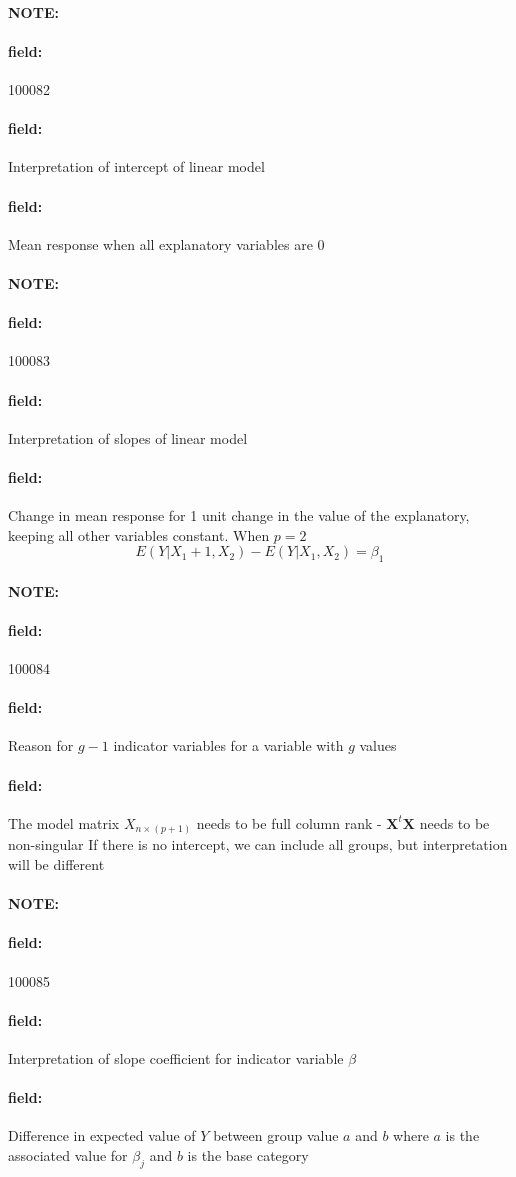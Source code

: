 \documentclass[12pt]{article}
\newenvironment{note}{\paragraph{NOTE:}}{}
\newenvironment{field}{\paragraph{field:}}{}
\begin{document}
\begin{note} \begin{field} \tiny 100082 \end{field}
 \begin{field}
  Interpretation of intercept of linear model
 \end{field}
 \begin{field}
  Mean response when all explanatory variables are 0
 \end{field}
\end{note}



\begin{note} \begin{field} \tiny 100083 \end{field}
 \begin{field}
  Interpretation of slopes of linear model
 \end{field}
 \begin{field}
  Change in mean response for 1 unit change in the value of the explanatory, keeping all other variables constant. When $p = 2$
  $$ E(Y|X_1 + 1, X_2) - E(Y|X_1,X_2) = \beta_1$$
 \end{field}
\end{note}

\begin{note} \begin{field} \tiny 100084 \end{field}
 \begin{field}
  Reason for $g-1$ indicator variables for a variable with $g$ values
 \end{field}
 \begin{field}
  The model matrix $X_{n \times(p+1)}$ needs to be full column rank - $\mathbf{X}^t \mathbf{X}$ needs to be non-singular
  If there is no intercept, we can include all groups, but interpretation will be different
 \end{field}
\end{note}

\begin{note} \begin{field} \tiny 100085 \end{field}
 \begin{field}
  Interpretation of slope coefficient for indicator variable $\beta$
 \end{field}
 \begin{field}
  Difference in expected value of $Y$ between group value $a$ and $b$ where $a$ is the associated value for $\beta_j$ and $b$ is the base category
 \end{field}
\end{note}
\end{document}
